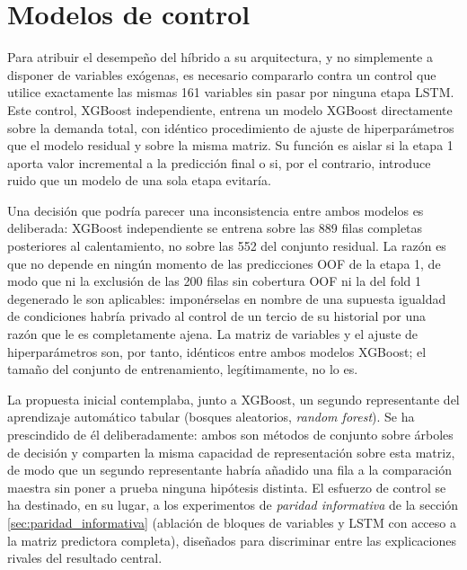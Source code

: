 \section{Modelos de control}\label{sec:modelos_control}

Para atribuir el desempeño del híbrido a su arquitectura, y no simplemente a disponer de
variables exógenas, es necesario compararlo contra un control que utilice exactamente las
mismas 161 variables sin pasar por ninguna etapa LSTM. Este control, XGBoost
independiente, entrena un modelo XGBoost directamente sobre la demanda total, con idéntico
procedimiento de ajuste de hiperparámetros que el modelo residual y sobre la misma matriz.
Su función es aislar si la etapa 1 aporta valor incremental a la predicción final o si,
por el contrario, introduce ruido que un modelo de una sola etapa evitaría.

Una decisión que podría parecer una inconsistencia entre ambos modelos es deliberada:
XGBoost independiente se entrena sobre las 889 filas completas posteriores al
calentamiento, no sobre las 552 del conjunto residual. La razón es que no depende en
ningún momento de las predicciones OOF de la etapa 1, de modo que ni la exclusión de las
200 filas sin cobertura OOF ni la del fold 1 degenerado le son aplicables: imponérselas en
nombre de una supuesta igualdad de condiciones habría privado al control de un tercio de
su historial por una razón que le es completamente ajena. La matriz de variables y el
ajuste de hiperparámetros son, por tanto, idénticos entre ambos modelos XGBoost; el tamaño
del conjunto de entrenamiento, legítimamente, no lo es.

La propuesta inicial contemplaba, junto a XGBoost, un segundo representante del
aprendizaje automático tabular (bosques aleatorios, \emph{random forest}). Se ha
prescindido de él deliberadamente: ambos son métodos de conjunto sobre árboles de decisión
y comparten la misma capacidad de representación sobre esta matriz, de modo que un segundo
representante habría añadido una fila a la comparación maestra sin poner a prueba ninguna
hipótesis distinta. El esfuerzo de control se ha destinado, en su lugar, a los
experimentos de \emph{paridad informativa} de la sección \ref{sec:paridad_informativa}
(ablación de bloques de variables y LSTM con acceso a la matriz predictora completa),
diseñados para discriminar entre las explicaciones rivales del resultado central.


